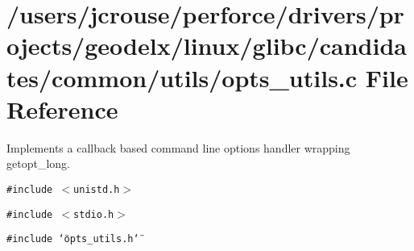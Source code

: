 \section{/users/jcrouse/perforce/drivers/projects/geodelx/linux/glibc/candidates/common/utils/opts\_\-utils.c File Reference}
\label{opts__utils_8c}
Implements a callback based command line options handler wrapping getopt\_\-long. 


{\tt \#include $<$unistd.h$>$}\par
{\tt \#include $<$stdio.h$>$}\par
{\tt \#include \char`\"{}opts\_\-utils.h\char`\"{}}\par
